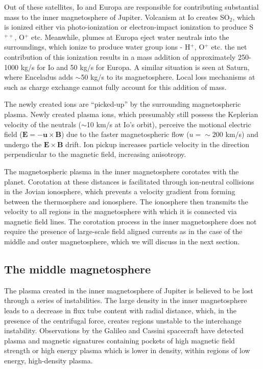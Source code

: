 Out of these satellites, Io and Europa are responsible for contributing substantial mass to the inner magnetosphere of Jupiter. Volcanism at Io creates SO$_2$, which is ionized either via photo-ionization or electron-impact ionization to produce S$^{++}$, O$^+$ etc. Meanwhile, plumes at Europa eject water neutrals into the surroundings, which ionize to produce water group ions - H$^+$, O$^+$ etc. the net contribution of this ionization results in a mass addition of approximately 250-1000 kg/s for Io and 50 kg/s for Europa. A similar situation is seen at Saturn, where Enceladus adds $\sim$50 kg/s to its magnetosphere. Local loss mechanisms at such as charge exchange cannot fully account for this addition of mass. 

The newly created ions are ``picked-up'' by the surrounding magnetospheric plasma. Newly created plasma ions, which presumably still possess the Keplerian velocity of the neutrals ($\sim$10 km/s at Io's orbit), perceive the motional electric field ($\mathbf{E} = -\mathbf{u} \times \mathbf{B}$) due to the faster magnetospheric flow ($u=\sim200$ km/s) and undergo the $\mathbf{E} \times \mathbf{B}$ drift. Ion pickup increases particle velocity in the direction perpendicular to the magnetic field, increasing anisotropy. 

The magnetospheric plasma in the inner magnetosphere corotates with the planet. Corotation at these distances is facilitated through ion-neutral collisions in the Jovian ionosphere, which prevents a velocity gradient from forming between the thermosphere and ionosphere. The ionosphere then transmits the velocity to all regions in the magnetosphere with which it is connected via magnetic field lines. The corotation process in the inner magnetosphere does not require the presence of large-scale field aligned currents as in the case of the middle and outer magnetosphere, which we will discuss in the next section. 

\subsection{The middle magnetosphere}
The plasma created in the inner magnetosphere of Jupiter is believed to be lost through a series of instabilities. The large density in the inner magnetosphere leads to a decrease in flux tube content with radial distance, which, in the presence of the centrifugal force, creates regions unstable to the interchange instability. Observations by the Galileo and Cassini spacecraft have detected plasma and magnetic signatures containing pockets of high magnetic field strength or high energy plasma which is lower in density, within regions of low energy, high-density plasma. 

